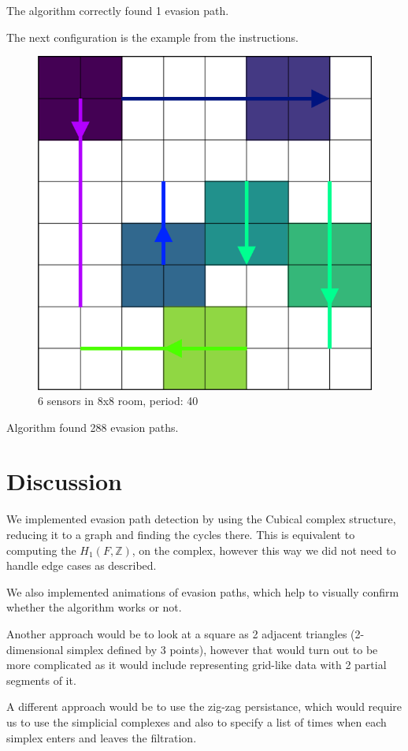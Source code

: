 \documentclass{article}
\begin{document}
The algorithm correctly found 1 evasion path.


\bigskip

The next configuration is the example from the instructions.
\begin{figure}[H]
  \centering
  \includegraphics[width=0.7\linewidth]{example.png}
  \caption{6 sensors in 8x8 room, period: 40}
  \label{fig:example}
\end{figure}

Algorithm found 288 evasion paths.



\section{Discussion}

We implemented evasion path detection by using the Cubical complex structure, reducing it to a graph and finding the cycles there.
This is equivalent to computing the $ H_1(F, \mathbb{Z}) $, on the complex, however this way we did not need to handle edge cases as described.

We also implemented animations of evasion paths, which help to visually confirm whether the algorithm works or not.

Another approach would be to look at a square as 2 adjacent triangles (2-dimensional simplex defined by 3 points), however that would turn out to be more complicated as it would include representing grid-like data with 2 partial segments of it.

A different approach would be to use the zig-zag persistance, which would require us to use the simplicial complexes and also to specify a list of times when each simplex enters and leaves the filtration.



\end{document}
